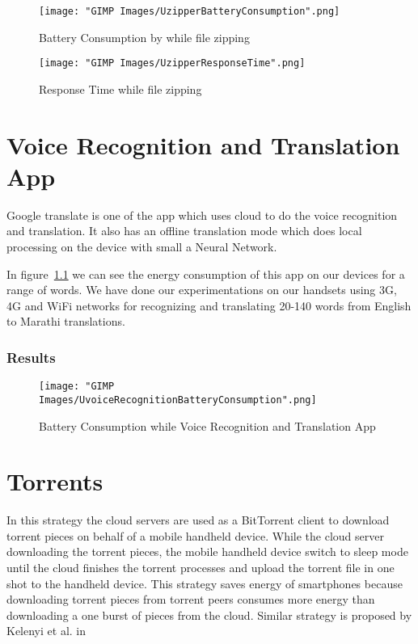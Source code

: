 \documentclass{report}
\begin{document}
\begin{figure}[h]
  \centering
  \texttt{[image: "GIMP Images/UzipperBatteryConsumption".png]}
  \caption{Battery Consumption by while file zipping}
  \label{fig:UzipperBatteryConsumption}
\end{figure}

\begin{figure}[h]
  \centering
  \texttt{[image: "GIMP Images/UzipperResponseTime".png]}
  \caption{Response Time while file zipping}
  \label{fig:UzipperResponseTime}
\end{figure}



\chapter{Voice Recognition and Translation App}
Google translate is one of the app which uses cloud to do the voice recognition and translation. It also has an offline translation mode which does local processing on the device with small a Neural Network. 

In figure~\ref{fig:UvoiceRecognitionBatteryConsumption} we can see the energy consumption of this app on our devices for a range of words. 
We have done our experimentations on our handsets using 3G, 4G and WiFi networks for recognizing and translating 20-140 words from English to Marathi translations. 
\subsection{Results}

\begin{figure}[h]
  \centering
  \texttt{[image: "GIMP Images/UvoiceRecognitionBatteryConsumption".png]}
  \caption{Battery Consumption while Voice Recognition and Translation App}
  \label{fig:UvoiceRecognitionBatteryConsumption}
\end{figure}



\chapter{Torrents}
In this strategy the cloud servers are used as a BitTorrent client to download torrent pieces on behalf of a mobile handheld device.
While the cloud server downloading the torrent pieces, the mobile handheld device switch to sleep mode until the cloud finishes the torrent processes and upload the torrent file in one shot to the handheld device. This strategy saves energy of smartphones
because downloading torrent pieces from torrent peers consumes more energy than downloading a one
burst of pieces from the cloud. Similar strategy is proposed by Kelenyi et al. in \cite{kelenyi2010cloudtorrent}
\end{document}
